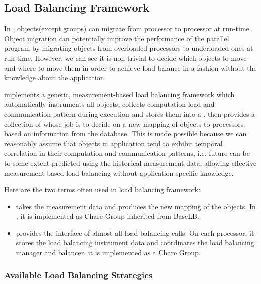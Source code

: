 \subsection{Load Balancing Framework}
\label{lbFramework}

In \charmpp{}, objects(except groups) can migrate from processor to 
processor at run-time. Object migration can potentially improve the 
performance of the parallel program by migrating objects from overloaded 
processors to underloaded ones at run-time. However, we can see it is 
non-trivial to decide which objects to move and where to move them in 
order to achieve load balance in a fashion without the knowledge about the 
application. 

 \charmpp{} implements a generic, measurement-based load balancing framework 
which automatically instruments all \charmpp{} objects, collects computation 
load and communication pattern during execution and stores them into a 
. \charmpp{} then provides a collection of 
 whose job is to decide on a new mapping of 
objects to processors based on information from the database.
This is made possible because we can reasonably assume that objects 
in \charmpp{} application tend to exhibit temporal correlation in 
their computation and communication patterns, i.e. future can be to some 
extent predicted using the historical measurement data, allowing effective 
measurement-based load balancing without application-specific knowledge. 

Here are the two terms often used in \charmpp{} load balancing framework:
\begin{itemize}
\item {} takes the measurement
   data and produces the new mapping of the objects. In \charmpp{}, it is
   implemented as Chare Group inherited from BaseLB.
\item {} provides the interface of almost all
   load balancing calls. On each processor, it stores the load 
   balancing instrument data and coordinates the load balancing manager and 
   balancer. it is implemented as a Chare Group.
\end{itemize}

\subsubsection{Available Load Balancing Strategies}
\label{lbStrategy}

